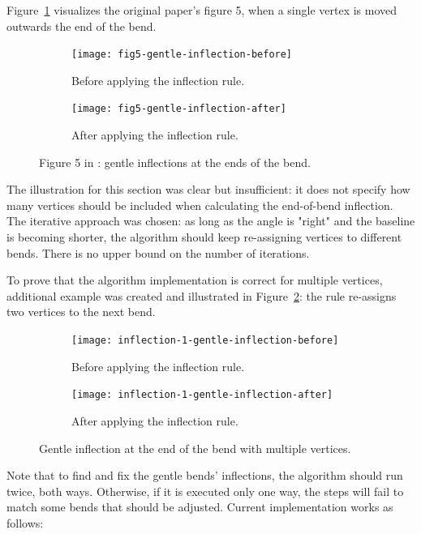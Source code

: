 \documentclass[a4paper]{article}
\begin{document}
Figure~\ref{fig:fig5-gentle-inflection} visualizes the original paper's figure 5,
when a single vertex is moved outwards the end of the bend.

\begin{figure}[ht]
    \centering
    \begin{subfigure}[b]{.49\textwidth}
        \texttt{[image: fig5-gentle-inflection-before]}
        \caption{Before applying the inflection rule.}
    \end{subfigure}
    \hfill
    \begin{subfigure}[b]{.49\textwidth}
        \texttt{[image: fig5-gentle-inflection-after]}
        \caption{After applying the inflection rule.}
    \end{subfigure}
    \caption{Figure 5 in \cite{wang1998line}: gentle inflections at the ends of
    the bend.}
    \label{fig:fig5-gentle-inflection}
\end{figure}


The illustration for this section was clear but insufficient: it does not
specify how many vertices should be included when calculating the end-of-bend
inflection. The iterative approach was chosen: as long as the angle is
"right" and the baseline is becoming shorter, the algorithm should keep
re-assigning vertices to different bends. There is no upper bound
on the number of iterations.

To prove that the algorithm implementation is correct for multiple vertices,
additional example was created and illustrated in
Figure~\ref{fig:inflection-1-gentle-inflection}: the rule re-assigns two
vertices to the next bend.

\begin{figure}[ht]
    \centering
    \begin{subfigure}[b]{.49\textwidth}
        \texttt{[image: inflection-1-gentle-inflection-before]}
        \caption{Before applying the inflection rule.}
    \end{subfigure}
    \hfill
    \begin{subfigure}[b]{.49\textwidth}
        \texttt{[image: inflection-1-gentle-inflection-after]}
        \caption{After applying the inflection rule.}
    \end{subfigure}
    \caption{Gentle inflection at the end of the bend with multiple vertices.}
    \label{fig:inflection-1-gentle-inflection}
\end{figure}

Note that to find and fix the gentle bends' inflections, the algorithm should
run twice, both ways. Otherwise, if it is executed only one way, the steps will
fail to match some bends that should be adjusted. Current implementation works
as follows:
\end{document}
